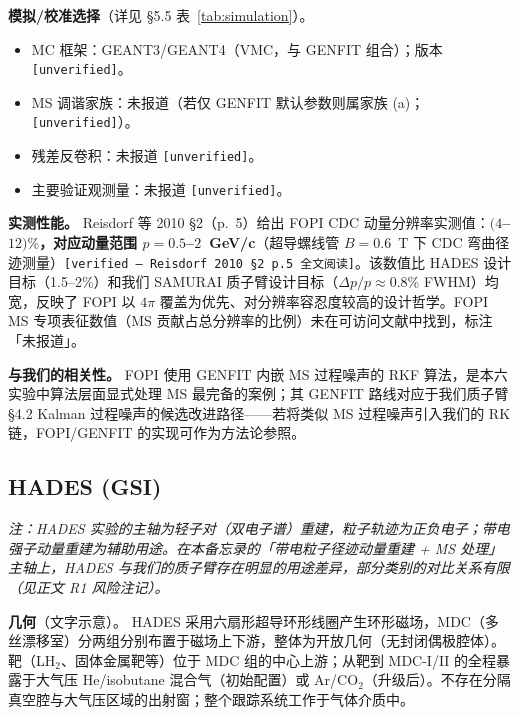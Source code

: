 \documentclass[a4paper, 11pt]{article}
\begin{document}
\textbf{模拟/校准选择}（详见 §5.5 表~\ref{tab:simulation}）。
\begin{itemize}[leftmargin=2em,itemsep=0pt]
\item MC 框架：GEANT3/GEANT4（VMC，与 GENFIT 组合）；版本 \texttt{[unverified]}。
\item MS 调谐家族：未报道（若仅 GENFIT 默认参数则属家族 (a)；\texttt{[unverified]}）。
\item 残差反卷积：未报道 \texttt{[unverified]}。
\item 主要验证观测量：未报道 \texttt{[unverified]}。
\end{itemize}

\textbf{实测性能。}
Reisdorf 等 2010 §2（p.~5）给出 FOPI CDC 动量分辨率实测值：\textbf{$(4$--$12)\%$，对应动量范围 $p = 0.5$--$2$~GeV/c}（超导螺线管 $B = 0.6$~T 下 CDC 弯曲径迹测量）\texttt{[verified --- Reisdorf 2010 §2 p.5 全文阅读]}。该数值比 HADES 设计目标（1.5--2\%）和我们 SAMURAI 质子臂设计目标（$\Delta p/p \approx 0.8\%$ FWHM）均宽，反映了 FOPI 以 $4\pi$ 覆盖为优先、对分辨率容忍度较高的设计哲学。FOPI MS 专项表征数值（MS 贡献占总分辨率的比例）未在可访问文献中找到，标注「未报道」。

\textbf{与我们的相关性。}
FOPI 使用 GENFIT 内嵌 MS 过程噪声的 RKF 算法，是本六实验中算法层面显式处理 MS 最完备的案例；其 GENFIT 路线对应于我们质子臂 §4.2 Kalman 过程噪声的候选改进路径——若将类似 MS 过程噪声引入我们的 RK 链，FOPI/GENFIT 的实现可作为方法论参照。

\subsection{HADES (GSI)}
\label{sec:card_hades}

\noindent\textit{\small 注：HADES 实验的主轴为轻子对（双电子谱）重建，粒子轨迹为正负电子；带电强子动量重建为辅助用途。在本备忘录的「带电粒子径迹动量重建 + MS 处理」主轴上，HADES 与我们的质子臂存在明显的用途差异，部分类别的对比关系有限（见正文 R1 风险注记）。}

\textbf{几何}（文字示意）。
HADES 采用六扇形超导环形线圈产生环形磁场，MDC（多丝漂移室）分两组分别布置于磁场上下游，整体为开放几何（无封闭偶极腔体）。靶（LH$_2$、固体金属靶等）位于 MDC 组的中心上游；从靶到 MDC-I/II 的全程暴露于大气压 He/isobutane 混合气（初始配置）或 Ar/CO$_2$（升级后）。不存在分隔真空腔与大气压区域的出射窗；整个跟踪系统工作于气体介质中。
\end{document}
